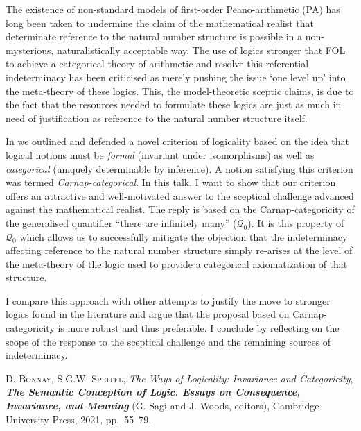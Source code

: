 \documentclass[bsl,meeting]{asl}
\newcommand{\NP}{}
\begin{document}
\thispagestyle{empty}


\NP  
{}

The existence of non-standard models of first-order Peano-arithmetic (PA) has long been taken to undermine the claim of the mathematical realist that determinate reference to the natural number structure is possible in a non-mysterious, naturalistically acceptable way. The use of logics stronger that FOL to achieve a categorical theory of arithmetic and resolve this referential indeterminacy has been criticised as merely pushing the issue `one level up' into the meta-theory of these logics. This, the model-theoretic sceptic claims, is due to the fact that the resources needed to formulate these logics are just as much in need of justification as reference to the natural number structure itself. 

In \cite{BonnaySpeitel2021} we outlined and defended a novel criterion of logicality based on the idea that logical notions must be \emph{formal} (invariant under isomorphisms) as well as \emph{categorical} (uniquely determinable by inference). A notion satisfying this criterion was termed \emph{Carnap-categorical}. In this talk, I want to show that our criterion offers an attractive and well-motivated answer to the sceptical challenge advanced against the mathematical realist. The reply is based on the Carnap-categoricity of the generalised quantifier ``there are infinitely many'' ($\mathcal{Q}_{0}$). It is this property of $\mathcal{Q}_{0}$ which allows us to successfully mitigate the objection that the indeterminacy affecting reference to the natural number structure simply re-arises at the level of the meta-theory of the logic used to provide a categorical axiomatization of that structure.

I compare this approach with other attempts to justify the move to stronger logics found in the literature and argue that the proposal based on Carnap-categoricity is more robust and thus preferable. I conclude by reflecting on the scope of the response to the sceptical challenge and the remaining sources of indeterminacy.

\begin{thebibliography}{10}

{\scshape D. Bonnay, S.G.W. Speitel},
{\itshape The Ways of Logicality: Invariance and Categoricity},
{\bfseries\itshape The Semantic Conception of Logic. Essays on Consequence, Invariance, and Meaning}
(G. Sagi and J. Woods, editors),
Cambridge University Press,
2021,
pp.~55--79.

\end{thebibliography}


\vspace*{-0.5\baselineskip}
\end{document}
